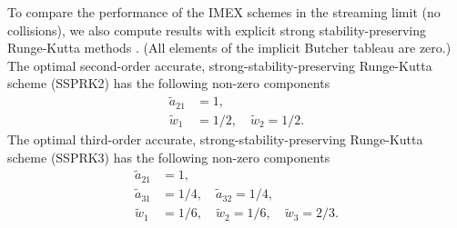 To compare the performance of the IMEX schemes in the streaming limit (no collisions), we also compute results with explicit strong stability-preserving Runge-Kutta methods \cite{gottlieb_etal_2001}.  
(All elements of the implicit Butcher tableau are zero.)  
The optimal second-order accurate, strong-stability-preserving Runge-Kutta scheme (SSPRK2) has the following non-zero components
\begin{align}
  \tilde{a}_{21} &= 1, \nonumber \\
  \tilde{w}_{1} &= 1/2, \quad \tilde{w}_{2} = 1/2. \nonumber 
\end{align}
The optimal third-order accurate, strong-stability-preserving Runge-Kutta scheme (SSPRK3) has the following non-zero components
\begin{align}
  \tilde{a}_{21} &= 1, \nonumber \\
  \tilde{a}_{31} &= 1/4, \quad \tilde{a}_{32} = 1/4, \nonumber \\
  \tilde{w}_{1} &= 1/6, \quad \tilde{w}_{2} = 1/6, \quad \tilde{w}_{3} =2/3. \nonumber
\end{align}